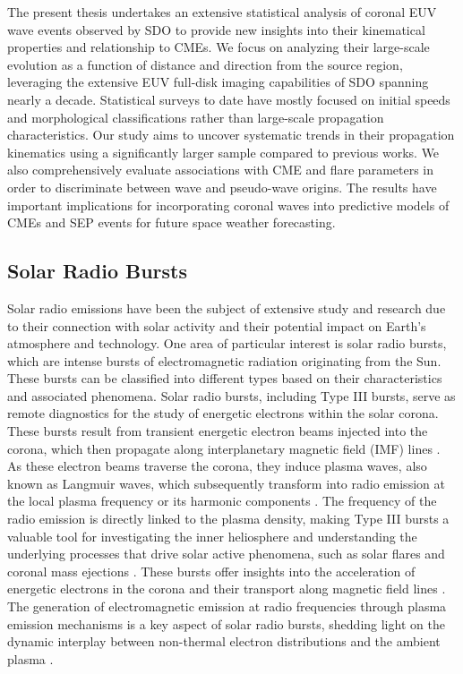 The present thesis undertakes an extensive statistical analysis of coronal EUV wave events observed by SDO to provide new insights into their kinematical properties and relationship to CMEs. We focus on analyzing their large-scale evolution as a function of distance and direction from the source region, leveraging the extensive EUV full-disk imaging capabilities of SDO spanning nearly a decade. Statistical surveys to date have mostly focused on initial speeds and morphological classifications rather than large-scale propagation characteristics. Our study aims to uncover systematic trends in their propagation kinematics using a significantly larger sample compared to previous works. We also comprehensively evaluate associations with CME and flare parameters in order to discriminate between wave and pseudo-wave origins. The results have important implications for incorporating coronal waves into predictive models of CMEs and SEP events for future space weather forecasting.

\subsection{Solar Radio Bursts}
Solar radio emissions have been the subject of extensive study and research due to their connection with solar activity and their potential impact on Earth's atmosphere and technology. One area of particular interest is solar radio bursts, which are intense bursts of electromagnetic radiation originating from the Sun. These bursts can be classified into different types based on their characteristics and associated phenomena. Solar radio bursts, including Type III bursts, serve as remote diagnostics for the study of energetic electrons within the solar corona. These bursts result from transient energetic electron beams injected into the corona, which then propagate along interplanetary magnetic field (IMF) lines \citep{ergun98, pick6, reid20}. As these electron beams traverse the corona, they induce plasma waves, also known as Langmuir waves, which subsequently transform into radio emission at the local plasma frequency or its harmonic components \citep{melrose17}.
The frequency of the radio emission is directly linked to the plasma density, making Type III bursts a valuable tool for investigating the inner heliosphere and understanding the underlying processes that drive solar active phenomena, such as solar flares and coronal mass ejections \citep{reid14, kontar17}. These bursts offer insights into the acceleration of energetic electrons in the corona and their transport along magnetic field lines \citep{reid_2014}. The generation of electromagnetic emission at radio frequencies through plasma emission mechanisms is a key aspect of solar radio bursts, shedding light on the dynamic interplay between non-thermal electron distributions and the ambient plasma \citep{melrose_1980}.

